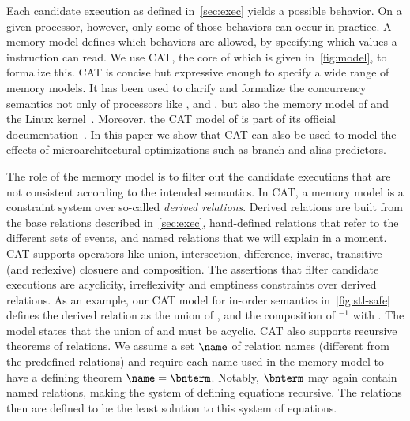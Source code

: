 \documentclass[conference]{IEEEtran}
\begin{document}
Each candidate execution as defined in~\autoref{sec:exec} yields a possible behavior.
On a given processor, however, only some of those behaviors can occur in practice.
A memory model defines which behaviors are allowed, by specifying which values a \load instruction can read.
We use CAT, the core of which is given in~\autoref{fig:model}, to formalize this.
CAT is concise but expressive enough to specify a wide range of memory models. 
It has been used to clarify and formalize the concurrency semantics not only of processors like \xes, \power and \arm, but also the memory model of \celeven and the Linux kernel~\cite{AlglaveMMPS18, AlglaveMT14, BattyDW16, PulteFDFSS18, SarkarSNORBMA09}.
Moreover, the CAT model of \armv is part of its official documentation~\cite{AlglaveDGHM21}.
In this paper we show that CAT can also be used to model the effects of microarchitectural optimizations such as branch and alias predictors.

The role of the memory model is to filter out the candidate executions that are not consistent according to the intended semantics.
In CAT, a memory model is a constraint system over so-called \emph{derived relations}. 
Derived relations are built from the base relations described in~\autoref{sec:exec}, hand-defined relations that refer to the different sets of events, and named relations that we will explain in a moment.
CAT supports operators like union, intersection, difference, inverse, transitive (and reflexive) {closuere} and composition.
The assertions that filter candidate executions are acyclicity, irreflexivity and emptiness constraints over derived relations.
As an example, our CAT model for in-order semantics in~\autoref{fig:stl-safe} defines the derived relation  as the union of ,  and the composition of $^{-1}$ with .
The model states that the union of  and  must be acyclic.
CAT also supports recursive theorems of relations.
We assume a set $\name$ of relation names (different from the predefined relations) and require each name used in the memory model to have a defining theorem $\name=\bnterm$. 
Notably, $\bnterm$ may again contain named relations, making the system of defining equations recursive.
The relations then are defined to be the least solution to this system of equations.
\end{document}
